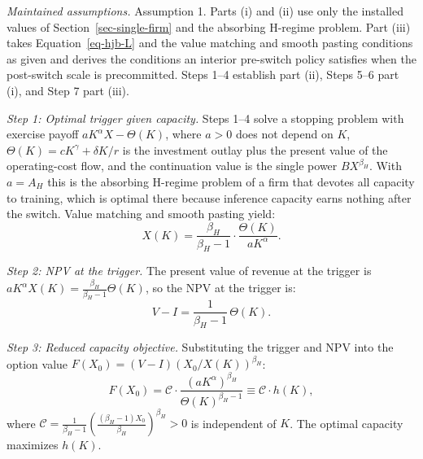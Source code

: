 \documentclass[
  11pt,
  letterpaper,
]{scrartcl}
\begin{document}
\emph{Maintained assumptions.} Assumption 1. Parts (i) and (ii) use only
the installed values of Section~\ref{sec-single-firm} and the absorbing
H-regime problem. Part (iii) takes Equation~\ref{eq-hjb-L} and the value
matching and smooth pasting conditions as given and derives the
conditions an interior pre-switch policy satisfies when the post-switch
scale is precommitted. Steps 1--4 establish part (ii), Steps 5--6 part
(i), and Step 7 part (iii).

\emph{Step 1: Optimal trigger given capacity.} Steps 1--4 solve a
stopping problem with exercise payoff \(a K^\alpha X - \Theta(K)\),
where \(a > 0\) does not depend on \(K\),
\(\Theta(K) = cK^\gamma + \delta K / r\) is the investment outlay plus
the present value of the operating-cost flow, and the continuation value
is the single power \(B X^{\beta_H}\). With \(a = A_H\) this is the
absorbing H-regime problem of a firm that devotes all capacity to
training, which is optimal there because inference capacity earns
nothing after the switch. Value matching and smooth pasting yield: \[
X(K) = \frac{\beta_H}{\beta_H - 1} \cdot \frac{\Theta(K)}{a K^\alpha}.
\]

\emph{Step 2: NPV at the trigger.} The present value of revenue at the
trigger is \(a K^\alpha X(K) = \frac{\beta_H}{\beta_H - 1} \Theta(K)\),
so the NPV at the trigger is: \[
V - I = \frac{1}{\beta_H - 1}\, \Theta(K).
\]

\emph{Step 3: Reduced capacity objective.} Substituting the trigger and
NPV into the option value \(F(X_0) = (V - I)(X_0/X(K))^{\beta_H}\): \[
F(X_0) = \mathcal{C} \cdot \frac{(a K^\alpha)^{\beta_H}}{\Theta(K)^{\beta_H - 1}} \equiv \mathcal{C} \cdot h(K),
\] where
\(\mathcal{C} = \frac{1}{\beta_H - 1}\left(\frac{(\beta_H - 1) X_0}{\beta_H}\right)^{\beta_H} > 0\)
is independent of \(K\). The optimal capacity maximizes \(h(K)\).
\end{document}
